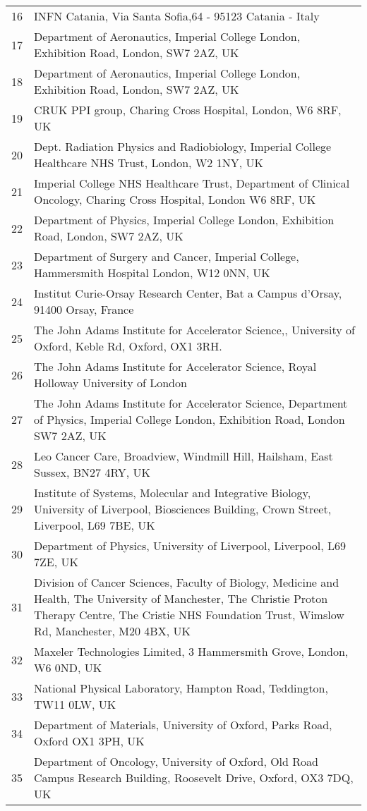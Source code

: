 {\begin{tabular}{ c p{15cm} }
     16 & INFN Catania, Via Santa Sofia,64 - 95123 Catania - Italy\\
     17 & Department of Aeronautics, Imperial College London, Exhibition Road, London, SW7 2AZ, UK\\
     18 & Department of Aeronautics, Imperial College London, Exhibition Road, London, SW7 2AZ, UK\\
     19 & CRUK PPI group, Charing Cross Hospital, London, W6 8RF, UK\\
     20 & Dept. Radiation Physics and Radiobiology, Imperial College Healthcare NHS Trust, London, W2 1NY, UK\\
     21 & Imperial College NHS Healthcare Trust, Department of Clinical Oncology, Charing Cross Hospital, London W6 8RF, UK\\
     22 & Department of Physics, Imperial College London, Exhibition Road, London, SW7 2AZ, UK\\
     23 & Department of Surgery and Cancer, Imperial College, Hammersmith Hospital London, W12 0NN, UK\\
     24 & Institut Curie-Orsay Research Center, Bat a Campus d'Orsay, 91400 Orsay, France\\
     25 & The John Adams Institute for Accelerator Science,, University of Oxford, Keble Rd, Oxford, OX1 3RH.\\
     26 & The John Adams Institute for Accelerator Science, Royal Holloway University of London\\
     27 & The John Adams Institute for Accelerator Science, Department of Physics, Imperial College London, Exhibition Road, London SW7 2AZ, UK\\
     28 & Leo Cancer Care, Broadview, Windmill Hill, Hailsham, East Sussex, BN27 4RY, UK\\
     29 & Institute of Systems, Molecular and Integrative Biology, University of Liverpool, Biosciences Building, Crown Street, Liverpool, L69 7BE, UK\\
     30 & Department of Physics, University of Liverpool, Liverpool, L69 7ZE, UK\\
     31 & Division of Cancer Sciences, Faculty of Biology, Medicine and Health, The University of Manchester, The Christie Proton Therapy Centre, The Cristie NHS Foundation Trust, Wimslow Rd, Manchester, M20 4BX, UK\\
     32 & Maxeler Technologies Limited, 3 Hammersmith Grove, London, W6 0ND, UK\\
     33 & National Physical Laboratory, Hampton Road, Teddington, TW11 0LW, UK\\
     34 & Department of Materials, University of Oxford, Parks Road, Oxford OX1 3PH, UK\\
     35 & Department of Oncology, University of Oxford, Old Road Campus Research Building, Roosevelt Drive, Oxford, OX3 7DQ, UK\\
  \end{tabular}
}
 
